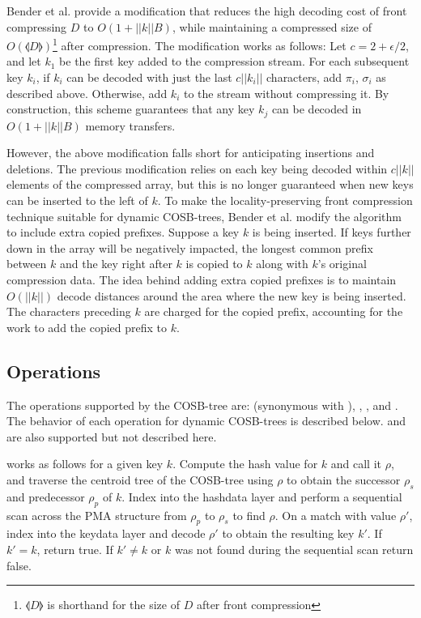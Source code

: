 \documentclass[preprint]{style}
\begin{document}
Bender et al. provide a modification that reduces the high decoding cost of
front compressing $D$ to $O(1+||k||B)$, while maintaining a compressed size of
$O(\llangle{D}\rrangle{})$\footnote{$\llangle{D}\rrangle{}$ is shorthand for
the size of $D$ after front compression} after compression. The modification
works as follows: Let $c = 2 + \epsilon/2$, and let $k_{1}$ be the first key
added to the compression stream. For each subsequent key $k_{i}$, if $k_{i}$
can be decoded with just the last $c||k_{i}||$ characters, add
$\pi_{i}$, $\sigma_{i}$ as described above. Otherwise, add $k_{i}$ to the stream
without compressing it. By construction, this scheme guarantees that any key
$k_{j}$ can be decoded in $O(1+||k||B)$ memory transfers.

However, the above modification falls short for anticipating insertions and
deletions. The previous modification relies on each key being decoded within
$c||k||$ elements of the compressed array, but this is no longer guaranteed
when new keys can be inserted to the left of $k$. To make the
locality-preserving front compression technique suitable for dynamic
COSB-trees, Bender et al. modify the algorithm to include extra copied
prefixes. Suppose a key $k$ is being inserted. If keys further down in the
array will be negatively impacted, the longest common prefix between $k$ and
the key right after $k$ is copied to $k$ along with $k$'s original compression
data. The idea behind adding extra copied prefixes is to maintain $O(||k||)$
decode distances around the area where the new key is being inserted. The
characters preceding $k$ are charged for the copied prefix, accounting for the
work to add the copied prefix to $k$.

\subsection{Operations}


The operations supported by the COSB-tree are: \Search{} (synonymous with \Member{}), \Pred{}, \Succ{},
and \Scan{}. The behavior of each operation for dynamic COSB-trees is
described below. \Insertkonly{} and \Delete{} are also supported but not
described here.

\Search{} works as follows for a given key $k$. Compute the hash value for
$k$ and call it $\rho$, and traverse the centroid tree of the COSB-tree using
$\rho$ to obtain the successor $\rho_{s}$ and predecessor $\rho_{p}$ of $k$.
Index into the hashdata layer and perform a sequential scan across the PMA
structure from $\rho_{p}$ to $\rho_{s}$ to find $\rho$. On a match with value
$\rho'$, index into the keydata layer and decode $\rho'$ to obtain the
resulting key $k'$. If $k' = k$, return true. If $k' \ne k$ or $k$ was not
found during the sequential scan return false.
\end{document}

